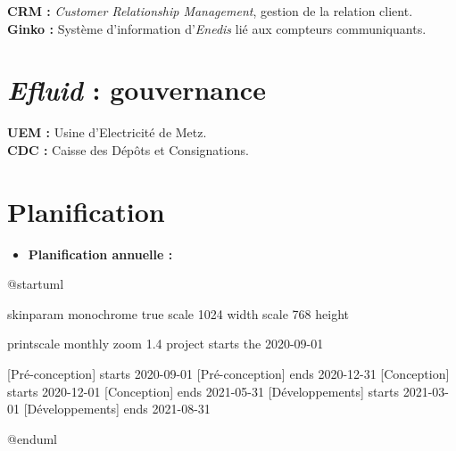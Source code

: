 \documentclass[a4paper, 12pt]{report}
\begin{document}
\vspace{1cm}
\noindent\textbf{CRM :} \textit{Customer Relationship Management}, gestion de la relation client.\\
\noindent\textbf{Ginko :} Système d'information d'\textit{Enedis} lié aux compteurs communiquants.

\chapter{\textit{Efluid} : gouvernance}
\label{appendix:efluid-gouvernance}

\begin{center}
\end{center}

\vspace{1cm}
\noindent\textbf{UEM :} Usine d'Electricité de Metz.\\
\noindent\textbf{CDC :} Caisse des Dépôts et Consignations.

\chapter{Planification}
\label{appendix:planification}

\begin{itemize}
  \item \textbf{Planification annuelle :}\\
\end{itemize}

\begin{center}
  \begin{plantuml}
    @startuml

    skinparam monochrome true
    scale 1024 width
    scale 768 height

    printscale monthly zoom 1.4
    project starts the 2020-09-01

    [Pré-conception] starts 2020-09-01
    [Pré-conception] ends 2020-12-31
    [Conception] starts 2020-12-01
    [Conception] ends 2021-05-31
    [Développements] starts 2021-03-01
    [Développements] ends 2021-08-31

    @enduml
  \end{plantuml}
\end{center}
\vspace{1cm}
\end{document}

